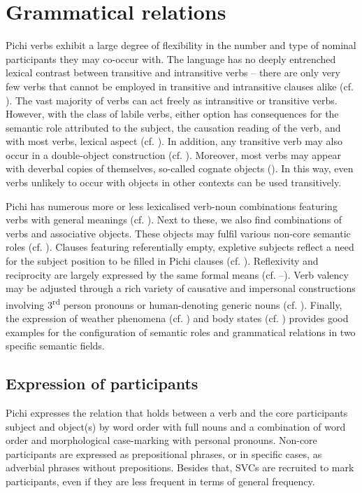 \chapter{Grammatical relations}

Pichi verbs exhibit a large degree of flexibility in the number and type of nominal participants they may co-occur with. The language has no deeply entrenched lexical contrast between transitive and intransitive verbs – there are only very few verbs that cannot be employed in transitive and intransitive clauses alike (cf. ). The vast majority of verbs can act freely as intransitive or transitive verbs. However, with the class of labile verbs, either option has consequences for the semantic role attributed to the subject, the causation reading of the verb, and with most verbs, lexical aspect (cf. ). In addition, any transitive verb may also occur in a double-object construction (cf. ). Moreover, most verbs may appear with deverbal copies of themselves, so-called cognate objects (). In this way, even verbs unlikely to occur with objects in other contexts can be used transitively. 


Pichi has numerous more or less lexicalised verb-noun combinations featuring verbs with general meanings (cf. ). Next to these, we also find combinations of verbs and associative objects. These objects may fulfil various non-core semantic roles (cf. ). Clauses featuring referentially empty, expletive subjects reflect a need for the subject position to be filled in Pichi clauses (cf. ). Reflexivity and reciprocity are largely expressed by the same formal means (cf. –). Verb valency may be adjusted through a rich variety of causative and impersonal constructions involving 3\textsuperscript{rd} person pronouns or human-denoting generic nouns (cf. ). Finally, the expression of weather phenomena (cf. ) and body states (cf. ) provides good examples for the configuration of semantic roles and grammatical relations in two specific semantic fields.


\section{Expression of participants}\label{sec:9.1}

Pichi expresses the relation that holds between a verb and the core participants subject and object(s) by word order with full nouns and a combination of word order and morphological case-marking with personal pronouns. Non-core participants are expressed as prepositional phrases, or in specific cases, as adverbial phrases without prepositions. Besides that, SVCs are recruited to mark participants, even if they are less frequent in terms of general frequency. 

